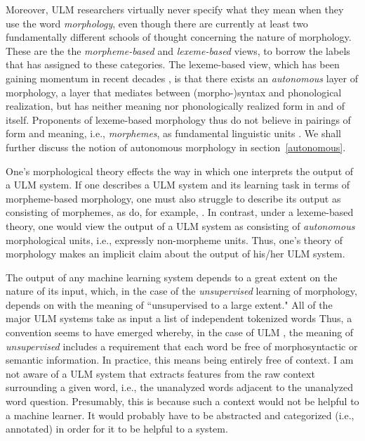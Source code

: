 Moreover, \ac{ULM} researchers virtually never specify what they mean
when they use the word \emph{morphology}, even though there
are currently at least two fundamentally different schools of thought concerning the nature of morphology. These are the 
the \emph{morpheme-based} and \emph{lexeme-based} views, to borrow the labels that \cite{aronoff:1994} has assigned 
to these categories. The lexeme-based view, which has been gaining momentum in recent decades \citep{anderson:2017},
is that there exists an \emph{autonomous} layer of morphology, a layer that mediates between (morpho-)syntax
and phonological realization, but has neither meaning nor phonologically realized form in and of itself. Proponents
of lexeme-based morphology thus do not believe in pairings of form and meaning, i.e., \emph{morphemes}, as fundamental linguistic
units \cite{anderson:2015}. We shall further discuss the notion of autonomous morphology in section~\ref{autonomous}. 

One's morphological theory effects the way in which one interprets the output of a \ac{ULM}  system. 
If one describes a \ac{ULM}  system and its learning task in terms of 
morpheme-based morphology, one must also struggle to 
describe its output as consisting of morphemes, as do, for example, 
\cite{creutz-and-lagus:2007,creutz-and-lagus:2005}. In contrast, under a 
lexeme-based theory, one would view the output of a \ac{ULM}  system as 
consisting of \emph{autonomous} morphological units, i.e., 
expressly non-morpheme units. 
Thus, one's theory of morphology makes an implicit claim about the output of 
his/her \ac{ULM}  system.

The output of any machine learning system depends to 
a great extent on the nature of its input, which, in the case of the 
\emph{unsupervised} learning of morphology, 
depends on with the meaning of ``unsupervised to a large extent." 
All of the major \ac{ULM}  
systems take as input a list of independent tokenized words 
\citep[e.g.,][]{goldsmith:2001,baroni-et-al:2002,creutz-and-lagus:2005,poon-et-al:2009}
Thus, a convention seems to have emerged whereby, in the 
case of \ac{ULM} , the meaning of \emph{unsupervised} includes a
requirement that each word be free of morphosyntactic 
or semantic information. In practice,
this means being entirely free of context. I am 
not aware of a \ac{ULM} system that extracts features from the raw context surrounding a given word, i.e.,
the unanalyzed words adjacent to the unanalyzed word question. Presumably, this is because 
such a context would not be helpful to a machine learner. 
It would probably have to be abstracted and categorized 
(i.e., annotated) in order
for it to be helpful to a system.

